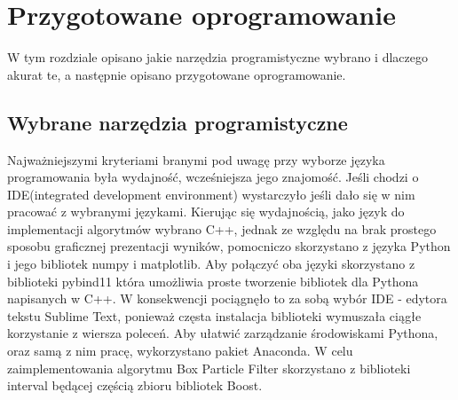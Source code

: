 \chapter{Przygotowane oprogramowanie}
W tym rozdziale opisano jakie narzędzia programistyczne wybrano i dlaczego akurat te, a następnie opisano przygotowane oprogramowanie.
\section{Wybrane narzędzia programistyczne}
Najważniejszymi kryteriami branymi pod uwagę przy wyborze języka programowania była wydajność, wcześniejsza jego znajomość. Jeśli chodzi o IDE(integrated development environment) wystarczyło jeśli dało się w nim pracować z wybranymi językami. Kierując się wydajnością, jako język do implementacji algorytmów wybrano C++, jednak ze względu na brak prostego sposobu graficznej prezentacji wyników, pomocniczo skorzystano z języka Python i jego bibliotek numpy\cite{numpy} i matplotlib\cite{matplotlib}. Aby połączyć oba języki skorzystano z biblioteki pybind11\cite{pybind11} która umożliwia proste tworzenie bibliotek dla Pythona napisanych w C++. W konsekwencji pociągnęło to za sobą wybór IDE - edytora tekstu Sublime Text\cite{sublime}, ponieważ częsta instalacja biblioteki wymuszała ciągłe korzystanie z wiersza poleceń. Aby ułatwić zarządzanie środowiskami Pythona, oraz samą z nim pracę, wykorzystano pakiet Anaconda\cite{anaconda}. W celu zaimplementowania algorytmu Box Particle Filter skorzystano z biblioteki interval będącej częścią zbioru bibliotek Boost\cite{boost_int}.
